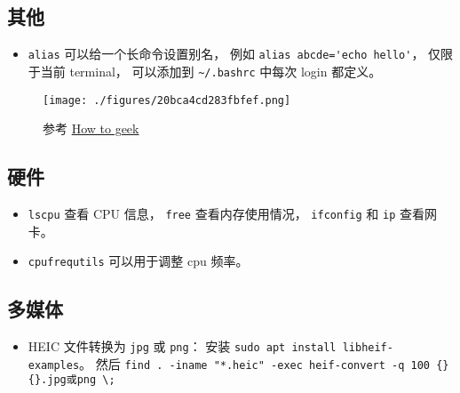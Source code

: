 \subsection{其他}
\begin{itemize}
\item \verb`alias` 可以给一个长命令设置别名， 例如 \verb|alias abcde='echo hello'|， 仅限于当前 terminal， 可以添加到 \verb|~/.bashrc| 中每次 login 都定义。
\end{itemize}

\begin{figure}[ht]
\centering
\texttt{[image: ./figures/20bca4cd283fbfef.png]}
\caption{参考 \href{https://www.howtogeek.com/}{How to geek}} \label{fig_LinNt_1}
\end{figure}

\subsection{硬件}
\begin{itemize}
\item \verb|lscpu| 查看 CPU 信息， \verb|free| 查看内存使用情况， \verb|ifconfig| 和 \verb|ip| 查看网卡。
\item \verb|cpufrequtils| 可以用于调整 cpu 频率。
\end{itemize}

\subsection{多媒体}
\begin{itemize}
\item HEIC 文件转换为 \verb|jpg| 或 \verb|png|： 安装 \verb|sudo apt install libheif-examples|。 然后 \verb|find . -iname "*.heic" -exec heif-convert -q 100 {} {}.jpg或png \;|
\end{itemize}
